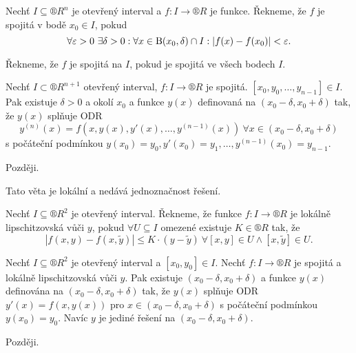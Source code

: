 \documentclass[12pt]{article}                   %
\begin{document}
        \begin{definice}
            Nechť $I \subseteq ®R^n$ je otevřený interval a $f: I \rightarrow ®R$ je funkce. Řekneme, že $f$ je spojitá v bodě $x_0 \in I$, pokud
            $$ \forall \varepsilon > 0\ \exists \delta > 0: \forall x \in \operatorname{B}(x_0, \delta) \cap I: |f(x) - f(x_0)| < \varepsilon. $$

            Řekneme, že $f$ je spojitá na $I$, pokud je spojitá ve všech bodech $I$.
        \end{definice}

        \begin{veta}[Peano s $y^{(n)}$]
            Nechť $I \subset ®R^{n+1}$ otevřený interval, $f: I \rightarrow ®R$ je spojitá. $[x_0, y_0, …, y_{n-1}] \in I$. Pak existuje $\delta > 0$ a okolí $x_0$ a funkce $y(x)$ definovaná na $(x_0 - \delta, x_0 + \delta)$ tak, že $y(x)$ splňuje ODR
            $$ y^{(n)}(x) = f(x, y(x), y'(x), …, y^{(n-1)}(x))\ \forall x \in (x_0 - \delta, x_0 + \delta) $$
            s počáteční podmínkou $y(x_0) = y_0, y'(x_0) = y_1, …, y^{(n-1)}(x_0) = y_{n-1}$.

            \begin{dukazin}
                Později.
            \end{dukazin}

            \begin{upozorneni}
                Tato věta je lokální a nedává jednoznačnost řešení.
            \end{upozorneni}
        \end{veta}

        \begin{definice}
            Nechť $I \subseteq ®R^2$ je otevřený interval. Řekneme, že funkce $f: I \rightarrow ®R$ je lokálně lipschitzovská vůči $y$, pokud $\forall U \subseteq I$ omezené existuje $K \in ®R$ tak, že
            $$ |f(x, y) - f(x, \tilde{y})| ≤ K·(y - \tilde{y})\  \forall [x, y] \in U \land [x, \tilde{y}] \in U. $$ 
        \end{definice}

        \begin{veta}[Picard]
            Nechť $I \subseteq ®R^2$ je otevřený interval a $[x_0, y_0] \in I$. Nechť $f: I \rightarrow ®R$ je spojitá a lokálně lipschitzovská vůči $y$. Pak existuje $(x_0 - \delta, x_0 + \delta)$ a funkce $y(x)$ definována na $(x_0 - \delta, x_0 + \delta)$ tak, že $y(x)$ splňuje ODR $y'(x) = f(x, y(x))$ pro $x \in (x_0 - \delta, x_0 + \delta)$ s počáteční podmínkou $y(x_0) = y_0$. Navíc $y$ je jediné řešení na $(x_0 - \delta, x_0 + \delta)$.

            \begin{dukazin}
                Později.
            \end{dukazin}
        \end{veta}
\end{document}
